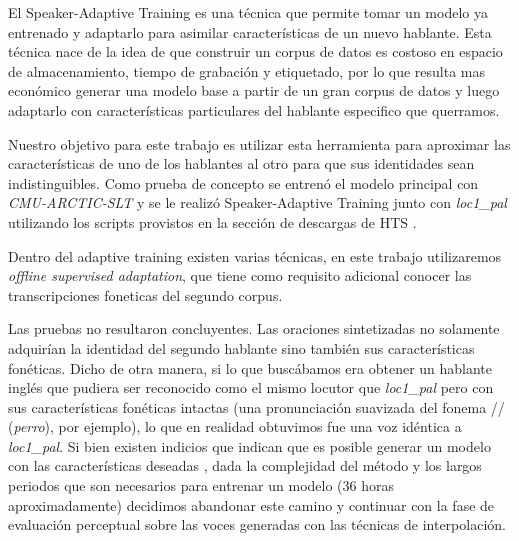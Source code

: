 El Speaker-Adaptive Training es una técnica que permite tomar un modelo ya entrenado y adaptarlo para asimilar características de un nuevo hablante. Esta técnica nace de la idea de que construir un corpus de datos es costoso en espacio de almacenamiento, tiempo de grabación y etiquetado, por lo que resulta mas económico generar una modelo base a partir de un gran corpus de datos y luego adaptarlo con características particulares del hablante especifico que querramos.

Nuestro objetivo para este trabajo es utilizar esta herramienta para aproximar las características de uno de los hablantes al otro para que sus identidades sean indistinguibles. Como prueba de concepto se entrenó el modelo principal con \textit{CMU-ARCTIC-SLT} y se le realizó Speaker-Adaptive Training junto con \textit{loc1\_pal} utilizando los scripts provistos en la sección de descargas de HTS \cite{speakerAdaptativeTrainingLink}.

Dentro del adaptive training existen varias técnicas, en este trabajo utilizaremos \textit{offline supervised adaptation}, que tiene como requisito adicional conocer las transcripciones foneticas del segundo corpus. 

Las pruebas no resultaron concluyentes. Las oraciones sintetizadas no solamente adquirían la identidad del segundo hablante sino también sus características fonéticas. Dicho de otra manera, si lo que buscábamos era obtener un hablante inglés que pudiera ser reconocido como el mismo locutor que \textit{loc1\_pal} pero con sus características fonéticas intactas (una pronunciación suavizada del fonema // (\textit{perro}), por ejemplo), lo que en realidad obtuvimos fue una voz idéntica a \textit{loc1\_pal}. Si bien existen indicios que indican que es posible generar un modelo con las características deseadas \cite{statisticalParam} \cite{speakerSim}, dada la complejidad del método y los largos periodos que son necesarios para entrenar un modelo ($36$ horas aproximadamente) decidimos abandonar este camino y continuar con la fase de evaluación perceptual sobre las voces generadas con las técnicas de interpolación.